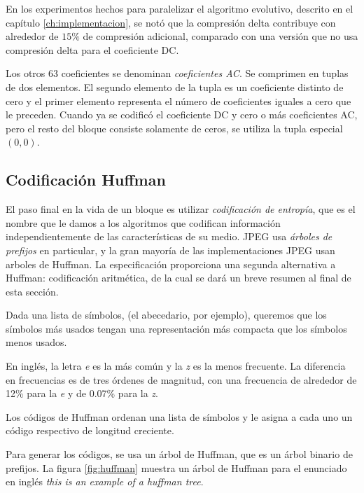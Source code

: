 En los experimentos hechos para paralelizar
el algoritmo evolutivo, descrito en el capítulo \ref{ch:implementacion}, se
notó que la compresión delta contribuye con alrededor de $15\%$ de compresión
adicional, comparado con una versión que no usa compresión delta para el
coeficiente DC.

Los otros 63 coeficientes se denominan \emph{\gls{coeficientes AC}}. Se
comprimen en tuplas de dos elementos. El segundo elemento de la tupla es un
coeficiente distinto de cero y el primer elemento representa el número
de coeficientes iguales a cero que le preceden. Cuando ya se codificó el
coeficiente DC y cero o más coeficientes AC, pero el resto del bloque consiste
solamente de ceros, se utiliza la tupla especial $(0,0)$.


\subsection{Codificación Huffman} \label{sub:huffman}

El paso final en la vida de un bloque es utilizar \emph{codificación de
entropía}, que es el nombre que le damos a los algoritmos que codifican
información independientemente de las características de su medio. JPEG usa
\emph{árboles de prefijos} en particular, y la gran mayoría de las implementaciones
JPEG usan arboles de Huffman. La especificación proporciona una segunda
alternativa a Huffman: codificación aritmética, de la cual se dará un breve
resumen al final de esta sección.

Dada una lista de símbolos, (el abecedario, por ejemplo), queremos que los
símbolos más usados tengan una representación más compacta que los símbolos
menos usados.

En inglés, la letra \emph{ e } es la más común y la \emph{ z } es la menos
frecuente.  \cite{Espanol} La diferencia en frecuencias es de tres órdenes de
magnitud, con una frecuencia de alrededor de 12\% para la \emph{e} y de 0.07\%
para la \emph{z}.

Los \gls{códigos de Huffman} ordenan una lista de símbolos y le asigna a cada
uno un código respectivo de longitud creciente.

Para generar los códigos, se usa un árbol de Huffman, que es un árbol binario
de prefijos. La figura \ref{fig:huffman} muestra un árbol de Huffman para el
enunciado en inglés \emph{this is an example of a huffman tree}.

